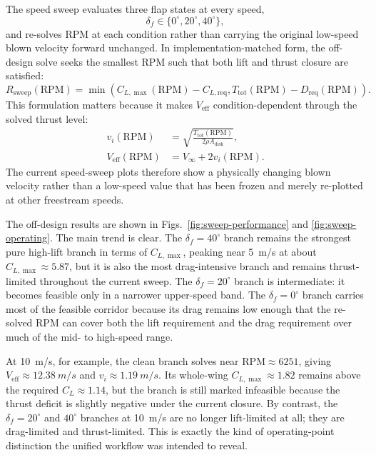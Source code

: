 \documentclass[conf]{new-aiaa}
\begin{document}
The speed sweep evaluates three flap states at every speed,
\begin{equation}
\delta_f \in \{0^\circ, 20^\circ, 40^\circ\},
\end{equation}
and re-solves RPM at each condition rather than carrying the original low-speed blown velocity forward unchanged. In implementation-matched form, the off-design solve seeks the smallest RPM such that both lift and thrust closure are satisfied:
\begin{equation}
R_{\mathrm{sweep}}(\mathrm{RPM})
=
\min\!\left(
C_{L,\max}(\mathrm{RPM})-C_{L,\mathrm{req}},
T_{\mathrm{tot}}(\mathrm{RPM})-D_{\mathrm{req}}(\mathrm{RPM})
\right).
\end{equation}
This formulation matters because it makes \(V_{\mathrm{eff}}\) condition-dependent through the solved thrust level:
\begin{align}
v_i(\mathrm{RPM}) &= \sqrt{\frac{T_{\mathrm{tot}}(\mathrm{RPM})}{2\rho A_{\mathrm{disk}}}}, \\
V_{\mathrm{eff}}(\mathrm{RPM}) &= V_\infty + 2v_i(\mathrm{RPM}).
\end{align}
The current speed-sweep plots therefore show a physically changing blown velocity rather than a low-speed value that has been frozen and merely re-plotted at other freestream speeds.

The off-design results are shown in Figs.~\ref{fig:sweep-performance} and \ref{fig:sweep-operating}. The main trend is clear. The \(\delta_f=40^\circ\) branch remains the strongest pure high-lift branch in terms of \(C_{L,\max}\), peaking near \SI{5}{m/s} at about \(C_{L,\max}\approx 5.87\), but it is also the most drag-intensive branch and remains thrust-limited throughout the current sweep. The \(\delta_f=20^\circ\) branch is intermediate: it becomes feasible only in a narrower upper-speed band. The \(\delta_f=0^\circ\) branch carries most of the feasible corridor because its drag remains low enough that the re-solved RPM can cover both the lift requirement and the drag requirement over much of the mid- to high-speed range.

At \SI{10}{m/s}, for example, the clean branch solves near \(\mathrm{RPM}\approx 6251\), giving \(V_{\mathrm{eff}}\approx \SI{12.38}{m/s}\) and \(v_i\approx \SI{1.19}{m/s}\). Its whole-wing \(C_{L,\max}\approx 1.82\) remains above the required \(C_L\approx 1.14\), but the branch is still marked infeasible because the thrust deficit is slightly negative under the current closure. By contrast, the \(\delta_f=20^\circ\) and \(40^\circ\) branches at \SI{10}{m/s} are no longer lift-limited at all; they are drag-limited and thrust-limited. This is exactly the kind of operating-point distinction the unified workflow was intended to reveal.
\end{document}
